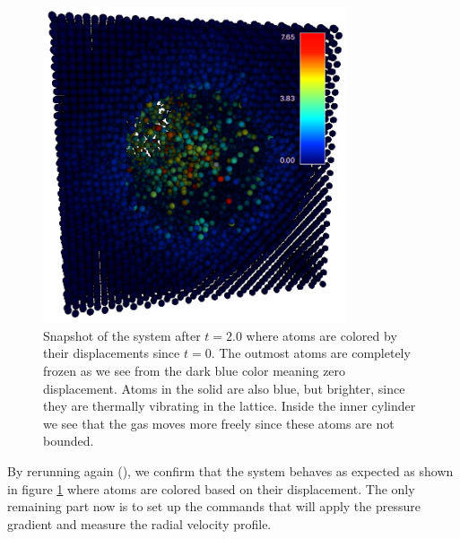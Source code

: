 \documentclass[12pt,a4paper,final]{iopart}
\begin{document}
\begin{figure}
	\centering
	\includegraphics[width=0.8\textwidth]{lj_flow/07_moving.png}
	\caption{
		Snapshot of the system after $t=2.0$ where atoms are colored by their displacements since $t=0$.
		The outmost atoms are completely frozen as we see from the dark blue color meaning zero displacement.
		Atoms in the solid are also blue, but brighter, since they are thermally vibrating in the lattice.
		Inside the inner cylinder we see that the gas moves more freely since these atoms are not bounded.
    }
	\label{fig:moving_atoms}
\end{figure}

By rerunning again (), we confirm that the system behaves as expected as shown in figure \ref{fig:moving_atoms} where
atoms are colored based on their displacement.
The only remaining part now is to set up the commands that will apply the pressure gradient and measure the radial velocity profile.
\end{document}
